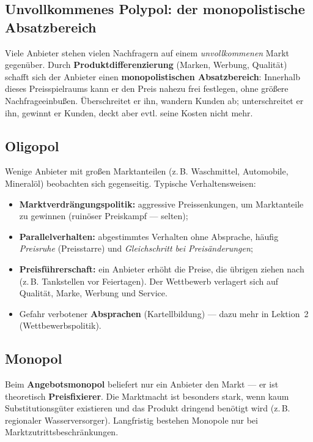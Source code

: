 \documentclass[11pt, a4paper]{article}
\begin{document}
\subsection{Unvollkommenes Polypol: der monopolistische Absatzbereich}

Viele Anbieter stehen vielen Nachfragern auf einem \emph{unvollkommenen} Markt gegenüber.
Durch \textbf{Produktdifferenzierung} (Marken, Werbung, Qualität) schafft sich der Anbieter
einen \textbf{monopolistischen Absatzbereich}: Innerhalb dieses Preisspielraums kann er den
Preis nahezu frei festlegen, ohne größere Nachfrageeinbußen. Überschreitet er ihn, wandern
Kunden ab; unterschreitet er ihn, gewinnt er Kunden, deckt aber evtl. seine Kosten nicht
mehr.

\subsection{Oligopol}

Wenige Anbieter mit großen Marktanteilen (z.\,B. Waschmittel, Automobile, Mineralöl)
beobachten sich gegenseitig. Typische Verhaltensweisen:

\begin{itemize}
  \item \textbf{Marktverdrängungspolitik:} aggressive Preissenkungen, um Marktanteile zu
    gewinnen (ruinöser Preiskampf --- selten);
  \item \textbf{Parallelverhalten:} abgestimmtes Verhalten ohne Absprache, häufig
    \emph{Preisruhe} (Preisstarre) und \emph{Gleichschritt bei Preisänderungen};
  \item \textbf{Preisführerschaft:} ein Anbieter erhöht die Preise, die übrigen ziehen nach
    (z.\,B. Tankstellen vor Feiertagen). Der Wettbewerb verlagert sich auf Qualität, Marke,
    Werbung und Service.
  \item Gefahr verbotener \textbf{Absprachen} (Kartellbildung) --- dazu mehr in Lektion~2
    (Wettbewerbspolitik).
\end{itemize}

\subsection{Monopol}

Beim \textbf{Angebotsmonopol} beliefert nur ein Anbieter den Markt --- er ist theoretisch
\textbf{Preisfixierer}. Die Marktmacht ist besonders stark, wenn kaum Substitutionsgüter
existieren und das Produkt dringend benötigt wird (z.\,B. regionaler Wasserversorger).
Langfristig bestehen Monopole nur bei Marktzutrittsbeschränkungen.
\end{document}
